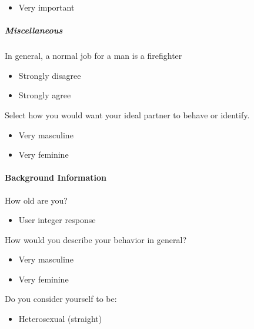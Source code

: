 \documentclass[twoside]{report}
\begin{document}
\begin{multicols*}{2}
\begin{multicols}{2}
\begin{itemize}
\item
  Very important
\end{itemize}

\subparagraph{Miscellaneous}

In general, a normal job for a man is a firefighter

\begin{itemize}
\item
  Strongly disagree
\end{itemize}

\begin{itemize}
\item
  Strongly agree
\end{itemize}

Select how you would want your ideal partner to behave or identify.

\begin{itemize}
\item
  Very masculine
\end{itemize}

\begin{itemize}
\item
  Very feminine
\end{itemize}

\paragraph{Background Information}

How old are you?

\begin{itemize}
\item
  User integer response
\end{itemize}

How would you describe your behavior in general?

\begin{itemize}
\item
  Very masculine
\end{itemize}

\begin{itemize}
\item
  Very feminine
\end{itemize}

Do you consider yourself to be:

\begin{itemize}
\item
  Heterosexual (straight)
\end{itemize}


\end{multicols}
\end{multicols*}
\end{document}
